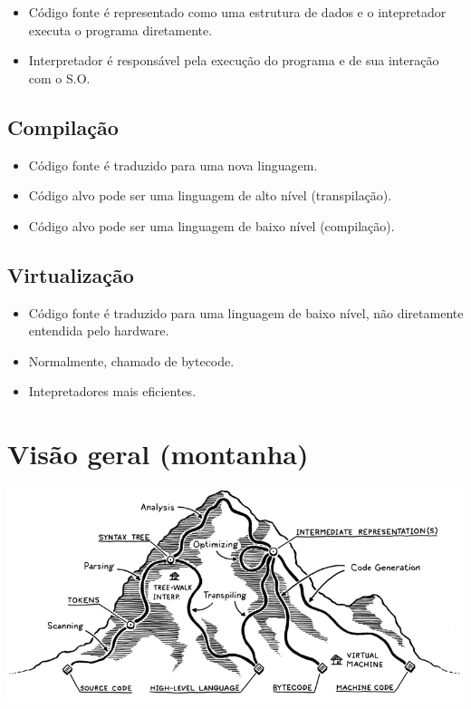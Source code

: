 \documentclass[11pt]{article}
\begin{document}
\begin{itemize}
\item Código fonte é representado como uma estrutura de dados e
o intepretador executa o programa diretamente.
\item Interpretador é responsável pela execução do programa e de
sua interação com o S.O.
\end{itemize}
\subsection*{Compilação}
\label{sec:org9b5ad72}

\begin{itemize}
\item Código fonte é traduzido para uma nova linguagem.
\item Código alvo pode ser uma linguagem de alto nível (transpilação).
\item Código alvo pode ser uma linguagem de baixo nível (compilação).
\end{itemize}
\subsection*{Virtualização}
\label{sec:orgeb73b4e}

\begin{itemize}
\item Código fonte é traduzido para uma linguagem de baixo nível, não diretamente entendida
pelo hardware.
\item Normalmente, chamado de bytecode.
\item Intepretadores mais eficientes.
\end{itemize}
\section*{Visão geral (montanha)}
\label{sec:org3d542ea}

\begin{center}
\includegraphics[width=.9\linewidth]{ montain.png}
\end{center}
\end{document}
